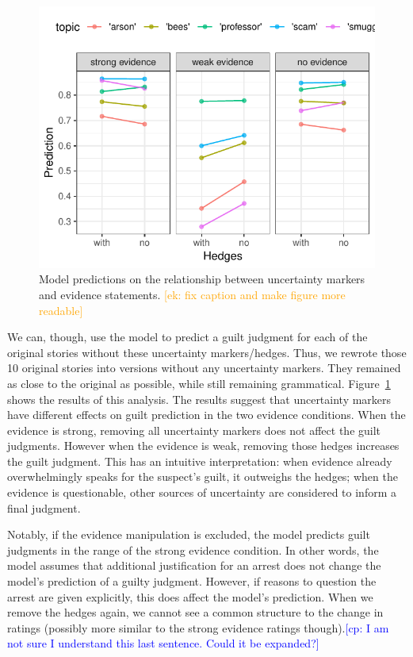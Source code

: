 \documentclass[11pt,a4paper]{article}
\newcommand{\ek}[1]{\textcolor{Orange}{[ek: #1]}}
\newcommand{\cp}[1]{\textcolor{Blue}{[cp: #1]}}
\begin{document}
\begin{figure}
	\includegraphics[width=1\linewidth]{graphs/hedges.pdf}
	\caption{Model predictions on the relationship between uncertainty markers and evidence statements. \ek{fix caption and make figure more readable}}
	\label{fig:hedges}
\end{figure}


We can, though, use the model to predict a guilt judgment for each of the original stories without these uncertainty markers/hedges. Thus, we rewrote those 10 original stories into versions without any uncertainty markers. They remained as close to the original as possible, while still remaining grammatical.
Figure~\ref{fig:hedges} shows the results of this analysis. The results suggest that uncertainty markers have different effects on guilt prediction in the two evidence conditions. When the evidence is strong, removing all uncertainty markers does not affect the guilt judgments. However when the evidence is weak, removing those hedges increases the guilt judgment. This has an intuitive interpretation: when evidence already overwhelmingly speaks for the suspect's guilt, it outweighs the hedges; when  the evidence is questionable, other sources of uncertainty are considered to inform a final judgment.

Notably, if the evidence manipulation is excluded, the model predicts guilt judgments in the range of the strong evidence condition. In other words, the model assumes that additional justification for an arrest does not change the model's prediction of a guilty judgment. However, if reasons to question the arrest are given explicitly, this does affect the model's prediction. When we remove the hedges again, we cannot see a common structure to the change in ratings (possibly more similar to the strong evidence ratings though).\cp{I am not sure I understand this last sentence. Could it be expanded?}
\end{document}
